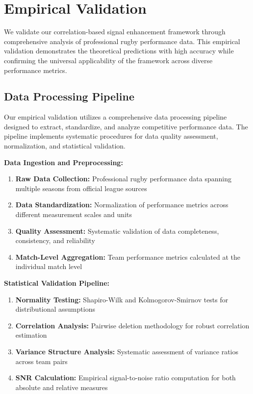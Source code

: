 \section{Empirical Validation}

We validate our correlation-based signal enhancement framework through comprehensive analysis of professional rugby performance data. This empirical validation demonstrates the theoretical predictions with high accuracy while confirming the universal applicability of the framework across diverse performance metrics.

\subsection{Data Processing Pipeline}

Our empirical validation utilizes a comprehensive data processing pipeline designed to extract, standardize, and analyze competitive performance data. The pipeline implements systematic procedures for data quality assessment, normalization, and statistical validation.

\textbf{Data Ingestion and Preprocessing:}
\begin{enumerate}
    \item \textbf{Raw Data Collection:} Professional rugby performance data spanning multiple seasons from official league sources
    \item \textbf{Data Standardization:} Normalization of performance metrics across different measurement scales and units
    \item \textbf{Quality Assessment:} Systematic validation of data completeness, consistency, and reliability
    \item \textbf{Match-Level Aggregation:} Team performance metrics calculated at the individual match level
\end{enumerate}

\textbf{Statistical Validation Pipeline:}
\begin{enumerate}
    \item \textbf{Normality Testing:} Shapiro-Wilk and Kolmogorov-Smirnov tests for distributional assumptions
    \item \textbf{Correlation Analysis:} Pairwise deletion methodology for robust correlation estimation
    \item \textbf{Variance Structure Analysis:} Systematic assessment of variance ratios across team pairs
    \item \textbf{SNR Calculation:} Empirical signal-to-noise ratio computation for both absolute and relative measures
\end{enumerate}

